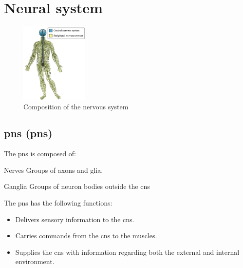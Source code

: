 \section{Neural system}

\begin{figure}[H]
    \centering
    \includegraphics[width=0.3\textwidth]{./img/neural_system.png}
    \caption{Composition of the nervous system}
\end{figure}


\subsection{\Acl{pns} (\acs{pns})}

The \acl{pns} is composed of:
\begin{descriptionlist}
    \item[Nerves] 
        Groups of axons and glia.

    \item[Ganglia] 
        Groups of neuron bodies outside the \acl{cns}
\end{descriptionlist}

The \ac{pns} has the following functions:
\begin{itemize}
    \item Delivers sensory information to the \acl{cns}.
    \item Carries commands from the \acl{cns} to the muscles.
    \item Supplies the \acl{cns} with information regarding both the external and internal environment.
\end{itemize}


